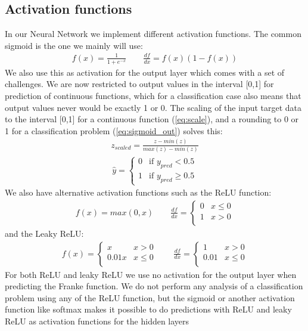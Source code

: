 \documentclass[11pt]{article}
\begin{document}
\subsection{Activation functions}
In our Neural Network we implement different activation functions. The common sigmoid is the one we mainly will use:
\begin{align*}
    f(x) = \frac{1 }{1 + e^{-x}} \quad\quad \frac{d f }{dx} = f(x) (1 - f(x))
\end{align*}
We also use this as activation for the output layer which comes with a set of challenges. We are now restricted to output values in the interval [0,1] for prediction of continuous functions, which for a classification case also means that output values never would be exactly 1 or 0. The scaling of the input target data to the interval [0,1] for a continuous function (\ref{eq:scale}), and a rounding to 0 or 1 for a classification problem (\ref{eq:sigmoid_out}) solves this:
\begin{align}
    \label{eq:scale}
    z_{scaled} = \frac{z- min(z)}{max(z)- min(z)}
\end{align}
\begin{align}
    \label{eq:sigmoid_out}
    \hat{y} =
    \begin{cases}
        0 & \text{if } y_{pred} < 0.5    \\
        1 & \text{if } y_{pred} \geq 0.5
    \end{cases}
\end{align}
We also have alternative activation functions such as the ReLU function:
\begin{align*}
    f(x) = max(0, x) \quad\quad \frac{df }{dx} =
    \begin{cases}
        0 & x\leq 0 \\
        1 & x > 0   \\
    \end{cases}
\end{align*}
and the Leaky ReLU:
\begin{align*}
    f(x) =
    \begin{cases}
        x     & x > 0    \\
        0.01x & x \leq 0 \\
    \end{cases}
    \quad\quad \frac{df }{dx} =
    \begin{cases}
        1    & x > 0    \\
        0.01 & x \leq 0 \\
    \end{cases}
\end{align*}
For both ReLU and leaky ReLU we use no activation for the output layer when predicting the Franke function. We do not perform any analysis of a classification problem using any of the ReLU function, but the sigmoid or another activation function like softmax makes it possible to do predictions with ReLU and leaky ReLU as activation functions for the hidden layers
\end{document}
